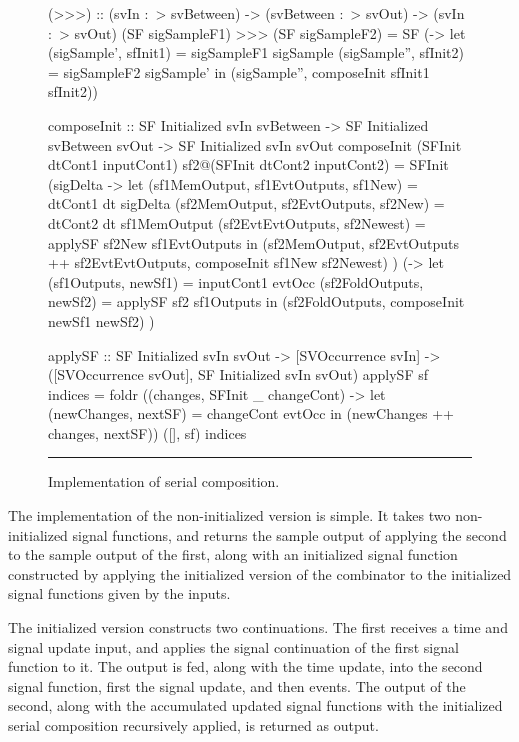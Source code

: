 \begin{figure}
\begin{code}
(>>>) ::    (svIn :~> svBetween) 
         -> (svBetween :~> svOut)
         -> (svIn :~> svOut)
(SF sigSampleF1) >>> (SF sigSampleF2) =
  SF (\sigSample -> let (sigSample', sfInit1) = sigSampleF1 sigSample
                        (sigSample'', sfInit2) = sigSampleF2 sigSample'
                    in (sigSample'', composeInit sfInit1 sfInit2))

composeInit ::     SF Initialized svIn svBetween
                -> SF Initialized svBetween svOut
                -> SF Initialized svIn svOut
composeInit (SFInit dtCont1 inputCont1) sf2@(SFInit dtCont2 inputCont2) =
  SFInit
    (\dt sigDelta -> 
       let (sf1MemOutput, sf1EvtOutputs, sf1New) = dtCont1 dt sigDelta
           (sf2MemOutput, sf2EvtOutputs, sf2New) = dtCont2 dt sf1MemOutput
           (sf2EvtEvtOutputs, sf2Newest) = applySF sf2New sf1EvtOutputs
       in (sf2MemOutput,
           sf2EvtOutputs ++ sf2EvtEvtOutputs,
           composeInit sf1New sf2Newest)
    )
    (\evtOcc -> 
      let (sf1Outputs, newSf1) = inputCont1 evtOcc
          (sf2FoldOutputs, newSf2) = applySF sf2 sf1Outputs
      in (sf2FoldOutputs, composeInit newSf1 newSf2)   
    )

applySF ::    SF Initialized svIn svOut
           -> [SVOccurrence svIn]
           -> ([SVOccurrence svOut],
               SF Initialized svIn svOut)
applySF sf indices =
  foldr (\evtOcc (changes, SFInit _ changeCont) ->
           let (newChanges, nextSF) = changeCont evtOcc
               in (newChanges ++ changes, nextSF))
        ([], sf)
        indices
\end{code}
\hrule
\caption{Implementation of serial composition.}
\label{figure:serial_composition_implementation}
\end{figure}

The implementation of the non-initialized version is simple. It takes two
non-initialized signal functions, and returns the sample output of applying the
second to the sample output of the first, along with an initialized signal
function constructed by applying the initialized version of the combinator to
the initialized signal functions given by the inputs.

The initialized version constructs two continuations. The first receives a time
and signal update input, and applies the signal continuation of the first
signal function to it. The output is fed, along with the time update, into the
second signal function, first the signal update, and then events. The output
of the second, along with the accumulated updated signal functions with the
initialized serial composition recursively applied, is returned as output.

